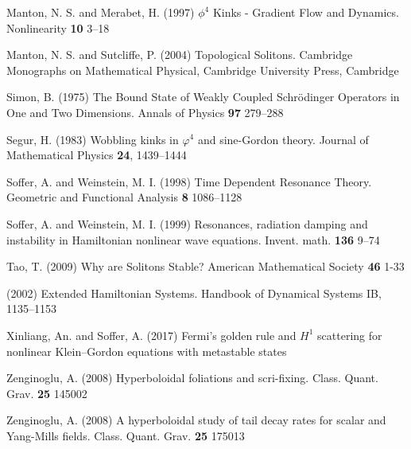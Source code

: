 \begin{thebibliography}{}
 Manton, N. S. and Merabet, H. (1997)
$\phi^4$ Kinks - Gradient Flow and Dynamics. Nonlinearity {\bf 10} 3--18

 Manton, N. S. and Sutcliffe, P. (2004)
Topological Solitons. Cambridge Monographs on Mathematical Physical, Cambridge University Press, Cambridge

 Simon, B. (1975)
The Bound State of Weakly Coupled Schr\"odinger Operators in One and Two Dimensions. Annals of Physics {\bf 97} 279--288

 Segur, H. (1983)
Wobbling kinks in $\varphi^4$ and sine-Gordon theory. Journal of Mathematical Physics {\bf 24}, 1439--1444

 Soffer, A. and Weinstein, M. I. (1998)
Time Dependent Resonance Theory. Geometric and Functional Analysis {\bf 8} 1086--1128

 Soffer, A. and Weinstein, M. I. (1999)
Resonances, radiation damping and instability in Hamiltonian nonlinear wave equations. Invent. math. {\bf 136} 9--74

 Tao, T. (2009)
Why are Solitons Stable? American Mathematical Society {\bf 46} 1-33

 (2002)
Extended Hamiltonian Systems. Handbook of Dynamical Systems IB, 1135--1153

 Xinliang, An. and Soffer, A. (2017)
Fermi's golden rule and $H^1$ scattering for nonlinear Klein--Gordon equations with metastable states

 Zenginoglu, A. (2008)
Hyperboloidal foliations and scri-fixing. Class. Quant. Grav. {\bf 25} 145002

 Zenginoglu, A. (2008)
A hyperboloidal study of tail decay rates for scalar and Yang-Mills fields. Class. Quant. Grav. {\bf 25} 175013





\end{thebibliography}